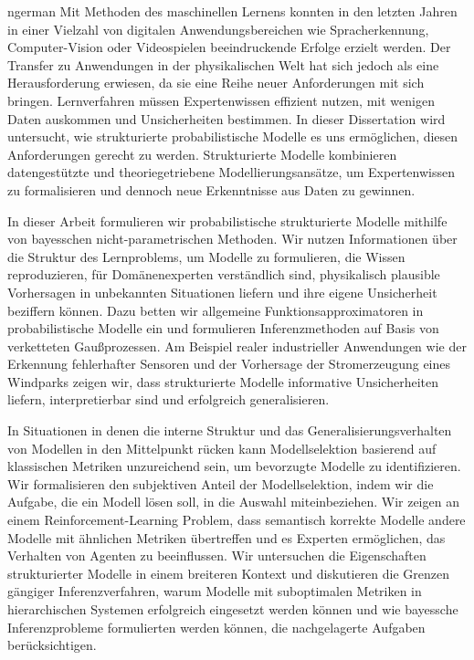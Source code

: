 \begin{titlepage}
    
\end{titlepage}

\begin{titlepage}
    
\end{titlepage}

\begin{Abstract}{ngerman}
    Mit Methoden des maschinellen Lernens konnten in den letzten Jahren in einer Vielzahl von digitalen Anwendungsbereichen wie Spracherkennung, Computer-Vision oder Videospielen beeindruckende Erfolge erzielt werden.
    Der Transfer zu Anwendungen in der physikalischen Welt hat sich jedoch als eine Herausforderung erwiesen, da sie eine Reihe neuer Anforderungen mit sich bringen.
    Lernverfahren müssen Expertenwissen effizient nutzen, mit wenigen Daten auskommen und Unsicherheiten bestimmen.
    In dieser Dissertation wird untersucht, wie strukturierte probabilistische Modelle es uns ermöglichen, diesen Anforderungen gerecht zu werden.
    Strukturierte Modelle kombinieren datengestützte und theoriegetriebene Modellierungsansätze, um Expertenwissen zu formalisieren und dennoch neue Erkenntnisse aus Daten zu gewinnen.

    In dieser Arbeit formulieren wir probabilistische strukturierte Modelle mithilfe von bayesschen nicht-parametrischen Methoden.
    Wir nutzen Informationen über die Struktur des Lernproblems, um Modelle zu formulieren, die Wissen reproduzieren, für Domänenexperten verständlich sind, physikalisch plausible Vorhersagen in unbekannten Situationen liefern und ihre eigene Unsicherheit beziffern können.
    Dazu betten wir allgemeine Funktionsapproximatoren in probabilistische Modelle ein und formulieren Inferenzmethoden auf Basis von verketteten Gaußprozessen.
    Am Beispiel realer industrieller Anwendungen wie der Erkennung fehlerhafter Sensoren und der Vorhersage der Stromerzeugung eines Windparks zeigen wir, dass strukturierte Modelle informative Unsicherheiten liefern, interpretierbar sind und erfolgreich generalisieren.

    In Situationen in denen die interne Struktur und das Generalisierungsverhalten von Modellen in den Mittelpunkt rücken kann Modellselektion basierend auf klassischen Metriken unzureichend sein, um bevorzugte Modelle zu identifizieren.
    Wir formalisieren den subjektiven Anteil der Modellselektion, indem wir die Aufgabe, die ein Modell lösen soll, in die Auswahl miteinbeziehen.
    Wir zeigen an einem Reinforcement-Learning Problem, dass semantisch korrekte Modelle andere Modelle mit ähnlichen Metriken übertreffen und es Experten ermöglichen, das Verhalten von Agenten zu beeinflussen.
    Wir untersuchen die Eigenschaften strukturierter Modelle in einem breiteren Kontext und diskutieren die Grenzen gängiger Inferenzverfahren, warum Modelle mit suboptimalen Metriken in hierarchischen Systemen erfolgreich eingesetzt werden können und wie bayessche Inferenzprobleme formulierten werden können, die nachgelagerte Aufgaben berücksichtigen.
\end{Abstract}

